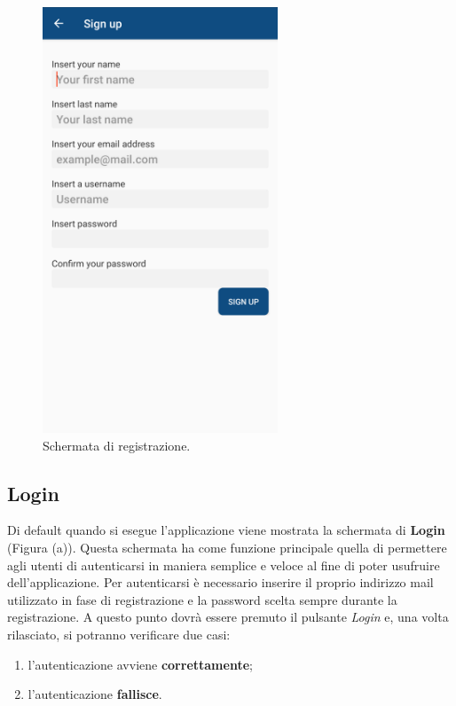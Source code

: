 \documentclass[a4paper,11pt,twoside,openright]{report}
\begin{document}
\begin{figure}
\centering
\includegraphics[width=\linewidth,height=360pt,keepaspectratio]{images/SignUp.png}
\caption{Schermata di registrazione.}
\end{figure}

\subsection{Login}
Di default quando si esegue l'applicazione viene mostrata la schermata di \textbf{Login} (Figura (a)). Questa schermata ha come funzione principale quella di permettere agli utenti
di autenticarsi in maniera semplice e veloce al fine di poter usufruire dell'applicazione. Per autenticarsi è necessario inserire il proprio indirizzo mail utilizzato in 
fase di registrazione e la password scelta sempre durante la registrazione. A questo punto dovrà essere premuto il pulsante \textit{Login} e, una volta rilasciato,
si potranno verificare due casi:

\begin{enumerate}
\item l'autenticazione avviene \textbf{correttamente};

\item l'autenticazione \textbf{fallisce}.
\end{enumerate}
 
\end{document}
